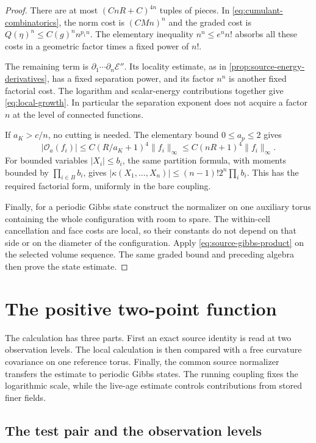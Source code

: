 \documentclass[11pt,letterpaper,reqno]{amsart}
\theoremstyle{definition}
\theoremstyle{remark}
\newcommand{\cO}{\mathcal O}
\begin{document}
\begin{proof}
There are at most $(CnR+C)^{4n}$ tuples of pieces. In
\eqref{eq:cumulant-combinatorics}, the norm cost is $(CMn)^n$ and
the graded cost is $Q(\eta)^n\le C(g)^nn^{p_1n}$. The elementary
inequality $n^n\le e^nn!$ absorbs all these costs in a geometric
factor times a fixed power of $n!$.

The remaining term is $\partial_1\cdots\partial_n\mathcal E''$.
Its locality estimate, as in
\cref{prop:source-energy-derivatives}, has a fixed separation power,
and its factor $n^n$ is another fixed factorial cost. The logarithm
and scalar-energy contributions together give
\eqref{eq:local-growth}. In particular the separation exponent does
not acquire a factor $n$ at the level of connected functions.

If $a_K>c/n$, no cutting is needed. The elementary bound
$0\le a_p\le2$ gives
\[
 |\cO_a(f_i)|\le C(R/a_K+1)^4\|f_i\|_\infty
                  \le C(nR+1)^4\|f_i\|_\infty.
\]
For bounded variables $|X_i|\le b_i$, the same partition formula,
with moments bounded by $\prod_{i\in B}b_i$, gives
$|\kappa(X_1,\ldots,X_n)|\le(n-1)!2^n\prod_ib_i$.
This has the required factorial form, uniformly in the bare coupling.

Finally, for a periodic Gibbs state construct the normalizer on one
auxiliary torus containing the whole configuration with room to spare.
The within-cell cancellation and face costs are local, so their
constants do not depend on that side or on the diameter of the
configuration. Apply \eqref{eq:source-gibbs-product} on the selected
volume sequence. The same graded bound and preceding algebra then
prove the state estimate.
\end{proof}


\section{The positive two-point function}\label{sec:two-point}

The calculation has three parts. First an exact source identity is
read at two observation levels. The local calculation is then compared
with a free curvature covariance on one reference torus. Finally,
the common source normalizer transfers the estimate to periodic Gibbs
states. The running coupling fixes the logarithmic scale, while the
live-age estimate controls contributions from stored finer fields.

\subsection{The test pair and the observation levels}
\end{document}
